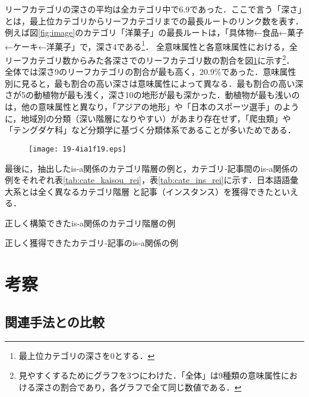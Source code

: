\documentclass[japanese]{jnlp_1.4}
\begin{document}
リーフカテゴリの深さの平均は全カテゴリ中で6.9であった．ここで言う「深さ」とは，最上位カテゴリからリーフカテゴリまでの最長ルートのリンク数を表す．
例えば図\ref{fig:image}のカテゴリ「洋菓子」の最長ルートは，「具体物←食品←菓子←ケーキ←洋菓子」で，深さ4である\footnote{最上位カテゴリの深さを0とする．}．
全意味属性と各意味属性における，全リーフカテゴリ数からみた各深さでのリーフカテゴリ数の割合を図\ref{fig:depth}に示す\footnote{見やすくするためにグラフを3つにわけた．「全体」は9種類の意味属性における深さの割合であり，各グラフで全て同じ数値である．}．
全体では深さ9のリーフカテゴリの割合が最も高く，20.9\%であった．意味属性別に見ると，最も割合の高い深さは意味属性によって異なる．最も割合の高い深さが5の動植物が最も浅く，深さ10の地形が最も深かった．動植物が最も浅いのは，他の意味属性と異なり，「アジアの地形」や「日本のスポーツ選手」のように，地域別の分類（深い階層になりやすい）があまり存在せず，「爬虫類」や「テングダケ科」など分類学に基づく分類体系であることが多いためである．

\begin{figure}[t]
\begin{center}
\texttt{[image: 19-4ia1f19.eps]}
\end{center}
\label{fig:depth}
\end{figure}

最後に，抽出したis-a関係のカテゴリ階層の例と，カテゴリ‐記事間のis-a関係の例をそれぞれ表\ref{tab:cate_kaisou_rei}，表\ref{tab:cate_ins_rei}に示す．日本語語彙大系とは全く異なるカテゴリ階層
と記事（インスタンス）を獲得できたといえる．


\begin{table}[p]
\caption{正しく構築できたis-a関係のカテゴリ階層の例}
\label{tab:cate_kaisou_rei}

\end{table}

\begin{table}[p]
\caption{正しく獲得できたカテゴリ‐記事のis-a関係の例}
\label{tab:cate_ins_rei}

\end{table}


\section{考察}
\label{sec:kousatsu}

\subsection{関連手法との比較}
\end{document}
